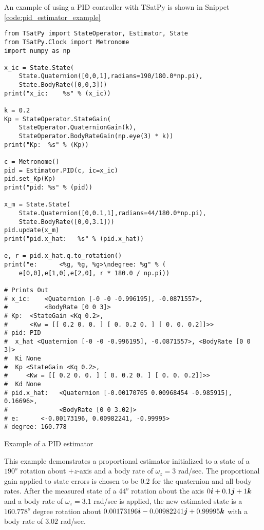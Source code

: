 An example of using a PID controller with TSatPy is shown in Snippet \ref{code:pid_estimator_example}
\begin{listing}[H]
\begin{singlespace}
  \begin{verbatim}
from TSatPy import StateOperator, Estimator, State
from TSatPy.Clock import Metronome
import numpy as np

x_ic = State.State(
    State.Quaternion([0,0,1],radians=190/180.0*np.pi),
    State.BodyRate([0,0,3]))
print("x_ic:    %s" % (x_ic))

k = 0.2
Kp = StateOperator.StateGain(
    StateOperator.QuaternionGain(k),
    StateOperator.BodyRateGain(np.eye(3) * k))
print("Kp:  %s" % (Kp))

c = Metronome()
pid = Estimator.PID(c, ic=x_ic)
pid.set_Kp(Kp)
print("pid: %s" % (pid))

x_m = State.State(
    State.Quaternion([0,0.1,1],radians=44/180.0*np.pi),
    State.BodyRate([0,0,3.1]))
pid.update(x_m)
print("pid.x_hat:   %s" % (pid.x_hat))

e, r = pid.x_hat.q.to_rotation()
print("e:      <%g, %g, %g>\ndegree: %g" % (
    e[0,0],e[1,0],e[2,0], r * 180.0 / np.pi))

# Prints Out
# x_ic:    <Quaternion [-0 -0 -0.996195], -0.0871557>,
#          <BodyRate [0 0 3]>
# Kp:  <StateGain <Kq 0.2>,
#      <Kw = [[ 0.2 0. 0. ] [ 0. 0.2 0. ] [ 0. 0. 0.2]]>>
# pid: PID
#  x_hat <Quaternion [-0 -0 -0.996195], -0.0871557>, <BodyRate [0 0 3]>
#  Ki None
#  Kp <StateGain <Kq 0.2>,
#     <Kw = [[ 0.2 0. 0. ] [ 0. 0.2 0. ] [ 0. 0. 0.2]]>>
#  Kd None
# pid.x_hat:   <Quaternion [-0.00170765 0.00968454 -0.985915], 0.16696>,
#              <BodyRate [0 0 3.02]>
# e:      <-0.00173196, 0.00982241, -0.99995>
# degree: 160.778
  \end{verbatim}
\caption{Example of a PID estimator}
\label{code:pid_estimator_example}
\nocite{minted}
\end{singlespace}
\end{listing}

This example demonstrates a proportional estimator initialized to a state of a $190^o$ rotation about $+z$-axis and a body rate of $\omega_z = 3$ rad/sec.  The proportional gain applied to state errors is chosen to be $0.2$ for the quaternion and all body rates.  After the measured state of a $44^o$ rotation about the axis $0 \boldsymbol{i} + 0.1 \boldsymbol{j} + 1\boldsymbol{k}$ and a body rate of $\omega_z = 3.1$ rad/sec is applied, the new estimated state is a $160.778^o$ degree rotation about $0.00173196 \boldsymbol{i} - 0.00982241 \boldsymbol{j} + 0.99995\boldsymbol{k}$ with a body rate of $3.02$ rad/sec.


